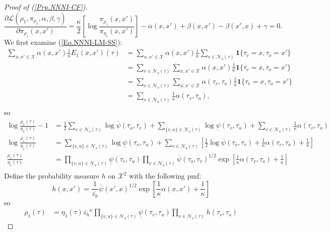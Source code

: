 \documentclass[12pt]{article}
\newcommand{\X}{{\mathcal{X}}}
\newcommand{\PO}{{\overline{\psi}}}
\newcommand{\PU}{{\underline{\psi}}}
\newcommand{\CF}{{h}}
\newcommand{\LM}{{\mathcal{L}}}
\newcommand{\one}[1]{\mathbf{1}\{#1\}}
\newcommand{\Ss}{{\rho_1}}
\newcommand{\SUs}{{\eta_1}}
\newcommand{\Es}{{\pi_\Ss}}
\newcommand{\EUs}{{\pi_\SUs}}
\newcommand{\NB}[1]{{\mathcal{N}_o(#1)}}
\numberwithin{equation}{section}
\begin{document}
\begin{proof}[Proof of (\ref{Prp.NNNI-CF})]
\begin{equation}
        \frac{\partial \LM(\Ss, \Es, \alpha, \beta, \gamma)}{\partial \Es(x, x')} = \frac\kappa2\left[\log\frac{\Es(x, x')}{\EUs(x, x')}\right] -\alpha(x, x') + \beta(x, x') - \beta(x', x) + \gamma = 0.
    \end{equation}
    We first examine (\ref{Eq.NNNI-LM-SS}):
    \begin{align*}
        \sum_{x, x'\in\X}\alpha(x, x')\frac1\kappa E_1(x, x')(\tau) & = \sum_{x, x'\in\X}\alpha(x, x')\frac1\kappa \sum_{v\in\NB{\tau}} \one{\tau_v=x, \tau_o=x'}          \\
                                                                    & = \sum_{v\in\NB{\tau}} \sum_{x, x'\in\X}\alpha(x, x')\frac1\kappa \one{\tau_v=x, \tau_o=x'}          \\
                                                                    & = \sum_{v\in\NB{\tau}} \sum_{x, x'\in\X}\alpha(\tau_v, \tau_o)\frac1\kappa \one{\tau_v=x, \tau_o=x'} \\
                                                                    & = \sum_{v\in\NB{\tau}} \frac1\kappa\alpha(\tau_v, \tau_o),                                           \\
    \end{align*}
    so
    \begin{align*}
        \log \frac{\Ss(\tau)}{\SUs(\tau)} - 1 & = \frac12\sum_{v\in\NB{\tau}}\log\PO(\tau_o, \tau_v)+\sum_{\{v, u\}\in\NB{\tau}}\log\PU(\tau_v, \tau_u) + \sum_{v\in\NB{\tau}} \frac1\kappa\alpha(\tau_v, \tau_o)          \\
        \log \frac{\Ss(\tau)}{\SUs(\tau)}     & = \sum_{\{v, u\}\in\NB{\tau}}\log\PU(\tau_v, \tau_u) + \sum_{v\in\NB{\tau}}\left[\frac12\log\PO(\tau_o, \tau_v) + \frac1\kappa\alpha(\tau_v, \tau_o) + \frac1\kappa\right] \\
        \frac{\Ss(\tau)}{\SUs(\tau)}          & = \prod_{\{v, u\}\in\NB{\tau}}\PU(\tau_v, \tau_u)\prod_{v\in\NB{\tau}}\PO(\tau_o, \tau_v)^{1/2}\exp\left[ \frac1\kappa\alpha(\tau_v, \tau_o) + \frac1\kappa\right]         \\
    \end{align*}
    Define the probability measure $\CF$ on $\X^2$ with the following pmf:
    \begin{equation}\label{Eq.NNNI-CF-ALPHA}
        \CF(x, x') = \frac{1}{\overline{z_\CF}}\PO(x', x)^{1/2}\exp\left[\frac1\kappa\alpha(x, x') + \frac1\kappa\right]
    \end{equation}
    so
    \begin{align*}
        \Ss(\tau) & = \SUs(\tau)\overline{z_\CF}^\kappa\prod_{\{v, u\}\in\NB{\tau}}\PU(\tau_v, \tau_u)\prod_{v\in\NB{\tau}}\CF(\tau_v, \tau_o)

\end{align*}
\end{proof}
\end{document}
